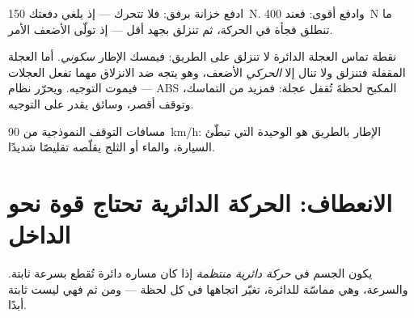 \begin{example}\label{ex:g11:forces-and-motion:wardrobe}
ادفع خزانة برفق: فلا تتحرك --- إذ يلغي 
دفعتك \qty{150}{N}. وادفع أقوى: فعند \qty{400}{N} ما تنطلق فجأة
في الحركة، ثم تنزلق بجهد أقل --- إذ تولّى 
الأضعف الأمر.
\end{example}

\begin{remark}\label{rem:g11:forces-and-motion:abs}
نقطة تماس العجلة الدائرة لا تنزلق على الطريق: فيمسك الإطار
 \emph{سكوني}. أما العجلة المقفلة فتنزلق ولا تنال إلا
 \emph{الحركي} الأضعف، وهو يتجه ضد الانزلاق
مهما تفعل العجلات --- فيموت التوجيه. ويحرّر نظام ABS المكبح
لحظةَ تُقفل عجلة: فمزيد من التماسك، وتوقف أقصر، وسائق يقدر على التوجيه.
\end{remark}

\begin{omfigure}

{\small مسافات التوقف النموذجية من \qty{90}{km/h}:  الإطار
بالطريق هو  الوحيدة التي تبطّئ السيارة، والماء أو الثلج يقلّصه تقليصًا شديدًا.}
\end{omfigure}

\section{الانعطاف: الحركة الدائرية تحتاج قوة نحو الداخل}

\begin{definition}\label{def:g11:forces-and-motion:ucm}
يكون الجسم في \emph{حركة دائرية منتظمة} إذا كان مساره دائرة تُقطع بسرعة ثابتة. والسرعة،
وهي مماسّة للدائرة، تغيّر اتجاهها في كل لحظة ---
ومن ثم فهي ليست ثابتة أبدًا.
\end{definition}

